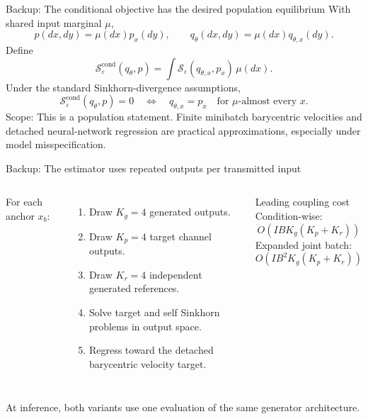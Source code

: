 \documentclass[aspectratio=169,10pt]{beamer}
\begin{document}
\begin{frame}{Backup: The conditional objective has the desired population equilibrium}
\small
With shared input marginal $\mu$,
\[
p(dx,dy)=\mu(dx)p_x(dy),\qquad q_\theta(dx,dy)=\mu(dx)q_{\theta,x}(dy).
\]
Define
\[
\mathcal S^{\mathrm{cond}}_\varepsilon(q_\theta,p)
=\int \mathcal S_\varepsilon(q_{\theta,x},p_x)\,\mu(dx).
\]
Under the standard Sinkhorn-divergence assumptions,
\[
\mathcal S^{\mathrm{cond}}_\varepsilon(q_\theta,p)=0
\quad\Longleftrightarrow\quad
q_{\theta,x}=p_x\quad\text{for $\mu$-almost every }x.
\]
\vspace{0.3cm}
\alert{Scope:} This is a population statement. Finite minibatch barycentric velocities and detached neural-network regression are practical approximations, especially under model misspecification.
\end{frame}

\begin{frame}{Backup: The estimator uses repeated outputs per transmitted input}
\begin{columns}[T,onlytextwidth]
For each anchor $x_b$:
\begin{enumerate}\setlength\itemsep{0.42em}
\item Draw $K_g=4$ generated outputs.
\item Draw $K_p=4$ target channel outputs.
\item Draw $K_r=4$ independent generated references.
\item Solve target and self Sinkhorn problems in output space.
\item Regress toward the detached barycentric velocity target.
\end{enumerate}
\begin{block}{Leading coupling cost}
\small
Condition-wise:
\[
O\!\left(IBK_g(K_p+K_r)\right)
\]
Expanded joint batch:
\[
O\!\left(IB^2K_g(K_p+K_r)\right)
\]
\end{block}
\end{columns}
\vspace{0.35cm}
\centering\color{muted}\small At inference, both variants use one evaluation of the same generator architecture.
\end{frame}
\end{document}
